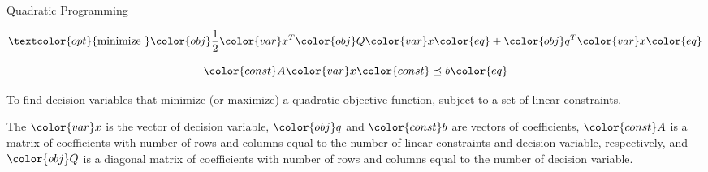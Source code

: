 \documentclass{beamer}
\begin{document}
\begin{frame}{Quadratic Programming}

    \begin{equation}
        \textcolor{opt}{\text{minimize~}}
        \color{obj} \frac{1}{2} 
        \color{var} x^T
        \color{obj} Q
        \color{var} x
        \color{eq} + 
        \color{obj} q^T
        \color{var} x
        \color{eq}
    \end{equation}

    \begin{equation}
        \color{const} A
        \color{var} x
        \color{const} \preceq b
        \color{eq}
    \end{equation}

    To find \textcolor{var}{decision variables} that \textcolor{opt}{minimize} (or \textcolor{opt}{maximize}) a \textcolor{obj}{quadratic objective function}, subject to a set of \textcolor{const}{linear constraints}.

    The $\color{var} x$ is the vector of \textcolor{var}{decision variable}, $\color{obj} q$ and $\color{const} b$ are vectors of coefficients, $\color{const} A$ is a matrix of coefficients with number of rows and columns equal to the number of \textcolor{const}{linear constraints} and \textcolor{var}{decision variable}, respectively, and $\color{obj} Q$ is a diagonal matrix of coefficients with number of rows and columns equal to the number of \textcolor{var}{decision variable}.
\end{frame}
\end{document}
